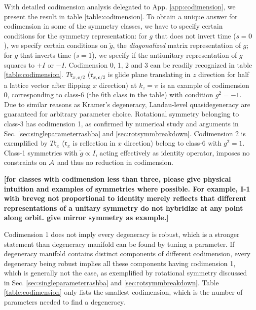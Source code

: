\documentclass[aps, prb, showpacs, twocolumn, notitlepage, superscriptaddress]{revtex4-1}
\begin{document}
With detailed codimension analysis delegated to App. \ref{app:codimension}, we present the result in table \ref{table:codimension}. To obtain a unique answer for codimension in some of the symmetry classes, we have to specify certain conditions for the symmetry representation: for $g$ that does not invert time ($s{=}0$), we specify certain conditions on  $\breve{g}$, the \emph{diagonalized} matrix representation  of $g$; for $g$ that inverts time  ($s{=}1$), we specify if the antiunitary representation of $g$ squares to $+I$ or $-I$.  Codimension 0, 1, 2 and 3 can be readily recognized in table \ref{table:codimension}. $T\mathfrak{r}_{x,\boldsymbol{c}/2}$ ($\mathfrak{r}_{x,\boldsymbol{c}/2}$ is glide plane translating in $z$ direction for half a lattice vector after flipping $x$ direction) at $k_z=\pi$ is an example of codimension 0, corresponding to class-6 (the 6th class in the table)  with condition $g^2=-1$. Due to similar reasons as Kramer's degeneracy, Landau-level quasidegeneracy are guaranteed for arbitrary parameter choice. Rotational symmetry belonging to class-3 has codimension 1, as confirmed by numerical study and arguments in Sec. \ref{sec:singleparameterrashba} and \ref{sec:rotsymmbreakdown}. Codimension 2 is exemplified by $T\mathfrak{r}_x$ ($\mathfrak{r}_x$ is reflection in $x$ direction) belong to class-6 with $g^2=1$. Class-1 symmetries with $\breve{g}\propto I$, acting effectively as identity operator, imposes no constraints on ${\cal A}$ and thus no reduction in codimension.


\textbf{[for classes with codimension less than three, please give physical intuition and examples of symmetries where possible. For example, I-1 with breveg not proportional to identity merely reflects that different representations of a unitary symmetry do not hybridize at any point along orbit. give mirror symmetry as example.]}

 Codimension 1 does not imply every degeneracy is robust, which is a stronger statement than degeneracy manifold can be found by tuning a parameter. If degeneracy manifold contains distinct components of different codimension, every degeneracy being robust implies all these components having codimension 1, which is generally not the case, as exemplified by rotational symmetry discussed in Sec. \ref{sec:singleparameterrashba} and \ref{sec:rotsymmbreakdown}. Table \ref{table:codimension} only lists the smallest codimension, which is the number of parameters needed to find a degeneracy. 
\end{document}
